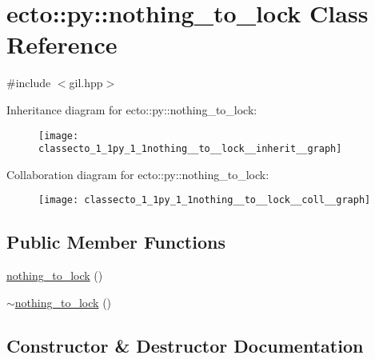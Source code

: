 \hypertarget{classecto_1_1py_1_1nothing__to__lock}{}\section{ecto\+:\+:py\+:\+:nothing\+\_\+to\+\_\+lock Class Reference}
\label{classecto_1_1py_1_1nothing__to__lock}


{\ttfamily \#include $<$gil.\+hpp$>$}



Inheritance diagram for ecto\+:\+:py\+:\+:nothing\+\_\+to\+\_\+lock\+:\nopagebreak
\begin{figure}[H]
\begin{center}
\leavevmode
\texttt{[image: classecto\_1\_1py\_1\_1nothing\_\_to\_\_lock\_\_inherit\_\_graph]}
\end{center}
\end{figure}


Collaboration diagram for ecto\+:\+:py\+:\+:nothing\+\_\+to\+\_\+lock\+:\nopagebreak
\begin{figure}[H]
\begin{center}
\leavevmode
\texttt{[image: classecto\_1\_1py\_1\_1nothing\_\_to\_\_lock\_\_coll\_\_graph]}
\end{center}
\end{figure}
\subsection*{Public Member Functions}
\begin{DoxyCompactItemize}
\item 
\hyperlink{classecto_1_1py_1_1nothing__to__lock_a277b110e856f61f30f645e4bed50c566}{nothing\+\_\+to\+\_\+lock} ()
\item 
\hyperlink{classecto_1_1py_1_1nothing__to__lock_aa734fa290aeb9aa7de729960aa12df9b}{$\sim$nothing\+\_\+to\+\_\+lock} ()
\end{DoxyCompactItemize}


\subsection{Constructor \& Destructor Documentation}
